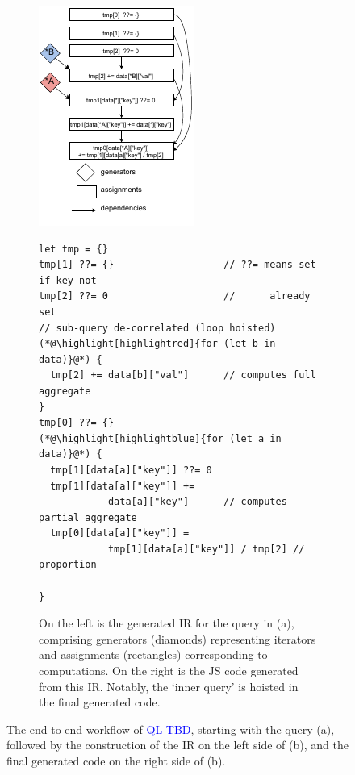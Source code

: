 \documentclass[runningheads]{llncs}
\newcommand{\lang}{\textcolor{blue}{QL-TBD}}
\begin{document}
\begin{figure}
\begin{subfigure}{\textwidth}
\begin{minipage}{0.38\textwidth}
\centering
\includegraphics{images/intro_ir.pdf}
\end{minipage}
\begin{minipage}{0.62\textwidth}
\begin{lstlisting}[style=JavaScript,columns=flexible]
let tmp = {}
tmp[1] ??= {}                   // ??= means set if key not 
tmp[2] ??= 0                    //      already set
// sub-query de-correlated (loop hoisted)
(*@\highlight[highlightred]{for (let b in data)}@*) {
  tmp[2] += data[b]["val"]      // computes full aggregate
}
tmp[0] ??= {}
(*@\highlight[highlightblue]{for (let a in data)}@*) {
  tmp[1][data[a]["key"]] ??= 0
  tmp[1][data[a]["key"]] +=
            data[a]["key"]      // computes partial aggregate
  tmp[0][data[a]["key"]] = 
            tmp[1][data[a]["key"]] / tmp[2] // proportion

}
\end{lstlisting}
\end{minipage}
\caption{
On the left is the generated IR for the query in (a), comprising generators
(diamonds) representing iterators and assignments (rectangles) corresponding
to computations.
On the right is the JS code generated from this IR.
Notably, the `inner query' is hoisted in the final
generated code.
}\label{fig:ir_code}
\end{subfigure}

\caption{
The end-to-end workflow of \lang{}, starting with the query (a),
followed by the construction of the IR on the left side of (b), and the
final generated code on the right side of (b).
}\label{fig:intro}
\vspace{-5mm}
\end{figure}
\end{document}
